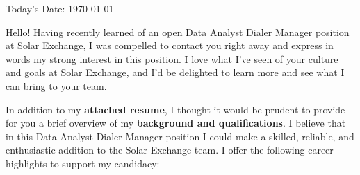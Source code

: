 \documentclass[8pt,a4paper,ragged2e,withhyper]{altacv}
\begin{document}
\hspace{.25cm}
\makecvheader


\newcommand{\empName}{Solar Exchange}
\newcommand{\jobName}{Data Analyst Dialer Manager}
\newcommand{\jobType}{position}

\begin{changemargin}{0.5cm}{0.7cm}
\large{Today's Date: \today}

\medskip
\medskip
\normalsize
\color{black}
\setlength{\parindent}{1.5em}
\setlength{\parskip}{0.75em}
\setlength{\line}{}

Hello! Having recently learned of an open \jobName{} \jobType{} at \empName{}, I was compelled to contact you right away and express in words my strong interest in this position. I love what I've seen of your culture and goals at \empName{}, and I'd be delighted to learn more and see what I can bring to your team. 


In addition to my \textbf{attached resume}, I thought it would be prudent to provide for you a brief overview of my \textbf{background and qualifications}. I believe that in this \jobName{} \jobType{} I could make a skilled, reliable, and enthusiastic addition to the \empName{} team. I offer the following career highlights to support my candidacy:


\end{changemargin}
\end{document}
